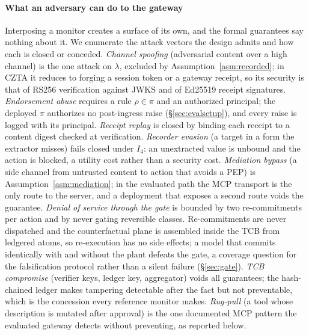 \documentclass[conference,compsoc]{IEEEtran}
\theoremstyle{definition}
\theoremstyle{plain}
\newcommand{\Ifour}{\ensuremath{I_4}}
\begin{document}
\paragraph*{What an adversary can do to the gateway}
Interposing a monitor creates a surface of its own, and the formal
guarantees say nothing about it. We enumerate the attack vectors the
design admits and how each is closed or conceded.
\emph{Channel spoofing} (adversarial content over a high channel) is
the one attack on $\lambda$, excluded by Assumption~\ref{asm:recorded};
in CZTA it reduces to forging a session token or a gateway receipt, so
its security is that of RS256 verification against JWKS and of Ed25519
receipt signatures. \emph{Endorsement abuse} requires a rule
$\rho \in \pi$ and an authorized principal; the deployed $\pi$
authorizes no post-ingress raise (\S\ref{sec:evalsetup}), and every
raise is logged with its principal. \emph{Receipt replay} is closed by
binding each receipt to a content digest checked at verification.
\emph{Recorder evasion} (a target in a form the extractor misses) fails
closed under \Ifour: an unextracted value is unbound and the action is
blocked, a utility cost rather than a security cost. \emph{Mediation bypass} (a side channel from untrusted
content to action that avoids a PEP) is Assumption~\ref{asm:mediation};
in the evaluated path the MCP transport is the only route to the
server, and a deployment that exposes a second route voids the
guarantee. \emph{Denial of service through the gate} is bounded by two
re-commitments per action and by never gating reversible classes.
Re-commitments are never dispatched and the counterfactual plane is
assembled inside the TCB from ledgered atoms, so re-execution has no
side effects; a model that commits identically with and without the
plant defeats the gate, a coverage question for the falsification
protocol rather than a silent failure (\S\ref{sec:gate}). \emph{TCB compromise}
(verifier keys, ledger key, aggregator) voids all guarantees; the
hash-chained ledger makes tampering detectable after the fact but not
preventable, which is the concession every reference monitor makes.
\emph{Rug-pull} (a tool whose description is mutated after approval)
is the one documented MCP pattern the evaluated gateway detects without
preventing, as reported below.
\end{document}
